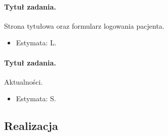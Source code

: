 \documentclass[a4paper]{article} \usepackage{polski} \usepackage[cp1250]{inputenc} \usepackage{url}
\begin{document}
\paragraph{Tytuł zadania.}  Strona tytułowa oraz formularz logowania pacjenta. \begin{itemize} \item Estymata: L. \end{itemize}
\paragraph{Tytuł zadania.} Aktualności. \begin{itemize} \item Estymata: S. \end{itemize}



\subsection{Realizacja}
\end{document}
